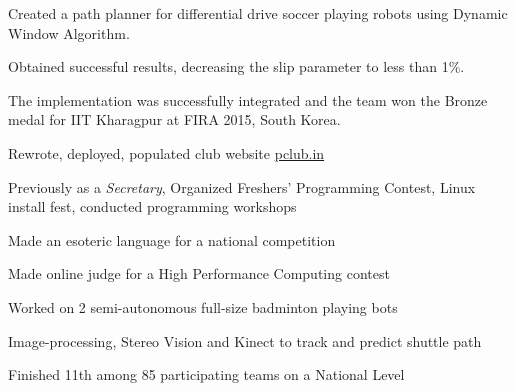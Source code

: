 \documentclass[a4paper]{deedy-resume} %
\begin{document}
\begin{minipage}[t]{0.66\textwidth}
  \sectionspace

  \runsubsection{}
  \vspace{\topsep}
  \begin{tightitemize}
  \item Created a path planner for differential drive soccer playing robots 
    using Dynamic Window Algorithm.
  \item	Obtained successful results, decreasing the slip parameter to less
    than 1\%.  
  \item The implementation was successfully integrated and the team won the 
    Bronze medal for IIT Kharagpur at FIRA 2015, South Korea.
  \end{tightitemize}

  \sectionspace

  \runsubsection{}
  \begin{tightitemize}
  \item Rewrote, deployed, populated club website \href{http://pclub.in}{pclub.in}
  \item Previously as a \textit{Secretary}, Organized Freshers'
    Programming Contest, Linux install fest, conducted
    programming workshops
  \end{tightitemize}

  \sectionspace

  \runsubsection{}
  \begin{tightitemize}
  \item Made an esoteric language for a national
    competition
  \item Made online judge for a High Performance Computing contest
  \end{tightitemize}


  \sectionspace

  \runsubsection{}
  \begin{tightitemize}
  \item Worked on 2 semi-autonomous full-size badminton playing bots
  \item Image-processing, Stereo Vision and Kinect to track and
    predict shuttle path
  \item Finished 11th among 85 participating teams on a National Level
  \end{tightitemize}


\end{minipage}
\end{document}

